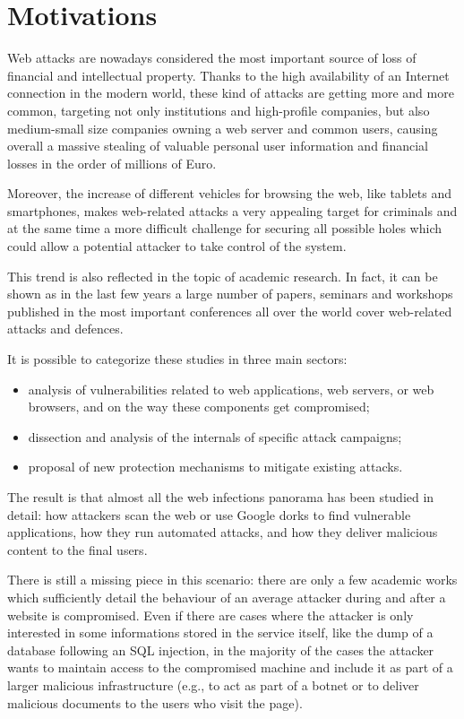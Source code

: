 \section{Motivations}

Web attacks are nowadays considered the most important source of loss of financial and intellectual property.
Thanks to the high availability of an Internet connection in the modern world, these kind of attacks are getting more and more common, targeting not only institutions and high-profile companies, but also medium-small size companies owning a web server and common users, causing overall a massive stealing of valuable personal user information and financial losses in the order of millions of Euro.

Moreover, the increase of different vehicles for browsing the web, like tablets and smartphones, makes web-related attacks a very appealing target for criminals and at the same time a more difficult challenge for securing all possible holes which could allow a potential attacker to take control of the system.

This trend is also reflected in the topic of academic research. In fact, it can be shown as in the last few years a large number of papers, seminars and workshops published in the most important conferences all over the world cover web-related attacks and defences.

It is possible to categorize these studies in three main sectors:
\begin{itemize}
\item analysis of vulnerabilities related to web applications, web servers, or web browsers, and on the way these components get compromised;
\item dissection and analysis of the internals of specific attack campaigns;
\item proposal of new protection mechanisms to mitigate existing attacks.
\end{itemize}
The result is that almost all the web infections panorama has been studied in detail: how attackers scan the web or use Google dorks to find vulnerable applications, how they run automated attacks, and how they deliver malicious content to the final users.

There is still a missing piece in this scenario: there are only a few academic works which sufficiently detail the behaviour of an average attacker during and after a website is compromised.
Even if there are cases where the attacker is only interested in some informations stored in the service itself, like the dump of a database following an SQL injection, in the majority of the cases the attacker wants to maintain access to the compromised machine and include it as part of a larger malicious infrastructure (e.g., to act as part of a botnet or to deliver malicious documents to the users who visit the page).

